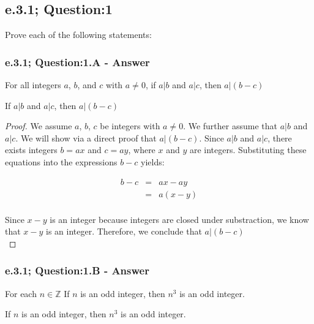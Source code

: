 \newpage
\subsection{e.3.1; Question:1}
Prove each of the following statements: 
\subsubsection*{e.3.1; Question:1.A - Answer}
For all integers $a$, $b$, and $c$ with $a \neq 0$, if $a | b$ and $a | c$, then $a | (b - c)$

\begin{tcolorbox}
	\begin{theorem}
		If $a | b$ and $a | c$, then $a | (b - c)$
	\end{theorem}
\end{tcolorbox}

\begin{proof}
We assume $a$, $b$, $c$ be integers with $a \neq 0$. We further assume that $a | b$ and $a | c$. We will show via a direct proof that $a | (b -c)$. Since $a | b$ and $a | c$, there exists integers $b = ax$ and $c = ay$, where $x$ and $y$ are integers. Substituting these equations into the expressions $b-c$ yields:

\begin{eqnarray*}
	b-c & = & ax - ay \nonumber \\	
	& = & a(x-y) \nonumber \\
\end{eqnarray*}

Since $x - y$ is an integer because integers are closed under substraction, we know that $x - y$ is an integer. Therefore, we conclude that $a | (b -c)$ \\
\end{proof}

\subsubsection*{e.3.1; Question:1.B - Answer}
For each $n \in \mathbb{Z}$ If $n$ is an odd integer, then $n^3$ is an odd integer.

\begin{tcolorbox}
	\begin{theorem}
		If $n$ is an odd integer, then $n^3$ is an odd integer.
	\end{theorem}
\end{tcolorbox}

